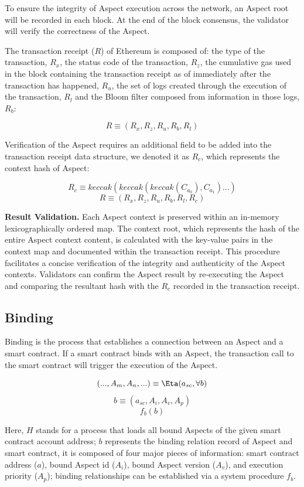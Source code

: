 To ensure the integrity of Aspect execution across the network, an Aspect root will be recorded in each block. At the end of the block consensus, the validator will verify the correctness of the Aspect.

The transaction receipt ($R$) of Ethereum is composed of: the type of the transaction, $R_x$, the status code of the transaction, $R_z$, the cumulative gas used in the block containing the transaction receipt as of immediately after the transaction has happened, $R_u$, the set of logs created through the execution of the transaction, $R_l$ and the Bloom filter composed from information in those logs, $R_b$:

\[
R \equiv (R_x, R_z, R_u, R_b, R_l)
\]

Verification of the Aspect requires an additional field to be added into the transaction receipt data structure, we denoted it as $R_c$, which represents the context hash of Aspect:

\[
R_c \equiv keccak(keccak(keccak(C_{a_0}),C_{a_1})...)
\]
\[
R \equiv (R_x, R_z, R_u, R_b, R_l, R_c)
\]

\textbf{Result Validation.} Each Aspect context is preserved within an in-memory lexicographically ordered map. The context root, which represents the hash of the entire Aspect context content, is calculated with the key-value pairs in the context map and documented within the transaction receipt. This procedure facilitates a concise verification of the integrity and authenticity of the Aspect contexts. Validators can confirm the Aspect result by re-executing the Aspect and comparing the resultant hash with the $R_c$ recorded in the transaction receipt.

\subsection{Binding}

Binding is the process that establishes a connection between an Aspect and a smart contract. If a smart contract binds with an Aspect, the transaction call to the smart contract will trigger the execution of the Aspect.

\[
(...,A_m, A_n,...) \equiv \Eta(a_{sc}, \forall b)
\]
\[
b \equiv (a_{sc},A_i, A_v, A_p)
\]
\[
f_{b}(b)
\]

Here, $H$ stands for a process that loads all bound Aspects of the given smart contract account address; $b$ represents the binding relation record of Aspect and smart contract, it is composed of four major pieces of information: smart contract address ($a$), bound Aspect id ($A_i$), bound Aspect version ($A_v$), and execution priority ($A_p$); binding relationships can be established via a system procedure $f_{b}$.

